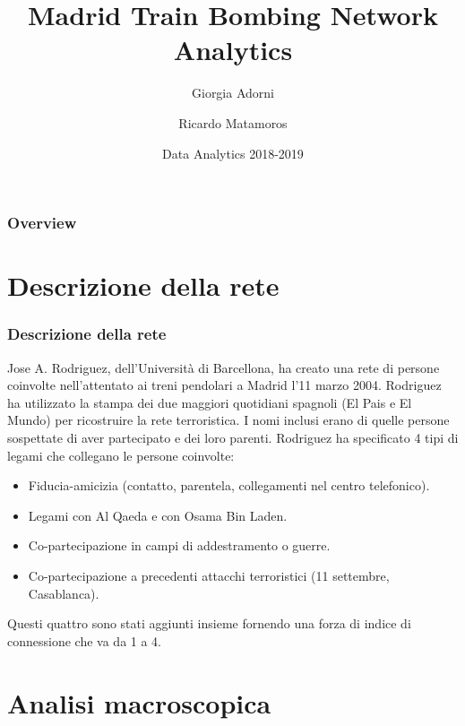 \documentclass[hyperref={pdfpagelabels=false}]{beamer}
\title[Community Detection]{Madrid Train Bombing Network Analytics} %
\author[Adorni, Matamoros]{Giorgia Adorni \and Ricardo Matamoros}
\institute[]{\textit{g.adorni@campus.unimib.it \\ r.matamorosaragon@campus.unimib.it} \\
\bigskip Università degli Studi di Milano-Bicocca }
\date{Data Analytics 2018-2019}
\begin{document}
	\begin{frame}
	\titlepage
	\end{frame}

\begin{frame}
\frametitle{Overview}
\tableofcontents
\end{frame}


\section{Descrizione della rete}

\begin{frame}
\frametitle{Descrizione della rete}
Jose A. Rodriguez, dell'Università di Barcellona, ha creato una rete di persone coinvolte nell'attentato ai treni pendolari a Madrid l'11 marzo 2004. Rodriguez ha utilizzato la stampa dei due maggiori quotidiani spagnoli (El Pais e El Mundo) per ricostruire la rete terroristica. I nomi inclusi erano di quelle persone sospettate di aver partecipato e dei loro parenti. Rodriguez ha specificato 4 tipi di legami che collegano le persone coinvolte:

\begin{itemize}
    \item Fiducia-amicizia (contatto, parentela, collegamenti nel centro telefonico).
    \item Legami con Al Qaeda e con Osama Bin Laden.
    \item Co-partecipazione in campi di addestramento o guerre.
    \item Co-partecipazione a precedenti attacchi terroristici (11 settembre, Casablanca).
\end{itemize}

Questi quattro sono stati aggiunti insieme fornendo una forza di indice di connessione che va da 1 a 4.
\end{frame}

\section{Analisi macroscopica}
\end{document}
